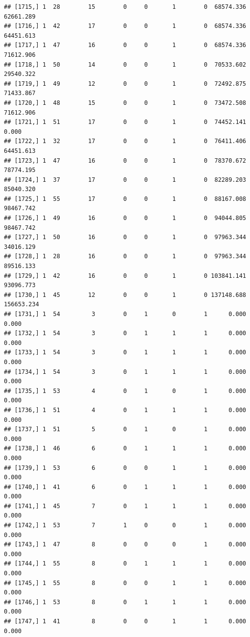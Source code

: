 \documentclass[
]{article}
\begin{document}
\begin{verbatim}
## [1715,] 1  28        15        0     0       1        0  68574.336  62661.289
## [1716,] 1  42        17        0     0       1        0  68574.336  64451.613
## [1717,] 1  47        16        0     0       1        0  68574.336  71612.906
## [1718,] 1  50        14        0     0       1        0  70533.602  29540.322
## [1719,] 1  49        12        0     0       1        0  72492.875  71433.867
## [1720,] 1  48        15        0     0       1        0  73472.508  71612.906
## [1721,] 1  51        17        0     0       1        0  74452.141      0.000
## [1722,] 1  32        17        0     0       1        0  76411.406  64451.613
## [1723,] 1  47        16        0     0       1        0  78370.672  78774.195
## [1724,] 1  37        17        0     0       1        0  82289.203  85040.320
## [1725,] 1  55        17        0     0       1        0  88167.008  98467.742
## [1726,] 1  49        16        0     0       1        0  94044.805  98467.742
## [1727,] 1  50        16        0     0       1        0  97963.344  34016.129
## [1728,] 1  28        16        0     0       1        0  97963.344  89516.133
## [1729,] 1  42        16        0     0       1        0 103841.141  93096.773
## [1730,] 1  45        12        0     0       1        0 137148.688 156653.234
## [1731,] 1  54         3        0     1       0        1      0.000      0.000
## [1732,] 1  54         3        0     1       1        1      0.000      0.000
## [1733,] 1  54         3        0     1       1        1      0.000      0.000
## [1734,] 1  54         3        0     1       1        1      0.000      0.000
## [1735,] 1  53         4        0     1       0        1      0.000      0.000
## [1736,] 1  51         4        0     1       1        1      0.000      0.000
## [1737,] 1  51         5        0     1       0        1      0.000      0.000
## [1738,] 1  46         6        0     1       1        1      0.000      0.000
## [1739,] 1  53         6        0     0       1        1      0.000      0.000
## [1740,] 1  41         6        0     1       1        1      0.000      0.000
## [1741,] 1  45         7        0     1       1        1      0.000      0.000
## [1742,] 1  53         7        1     0       0        1      0.000      0.000
## [1743,] 1  47         8        0     0       0        1      0.000      0.000
## [1744,] 1  55         8        0     1       1        1      0.000      0.000
## [1745,] 1  55         8        0     0       1        1      0.000      0.000
## [1746,] 1  53         8        0     1       1        1      0.000      0.000
## [1747,] 1  41         8        0     0       1        1      0.000      0.000

\end{verbatim}
\end{document}
